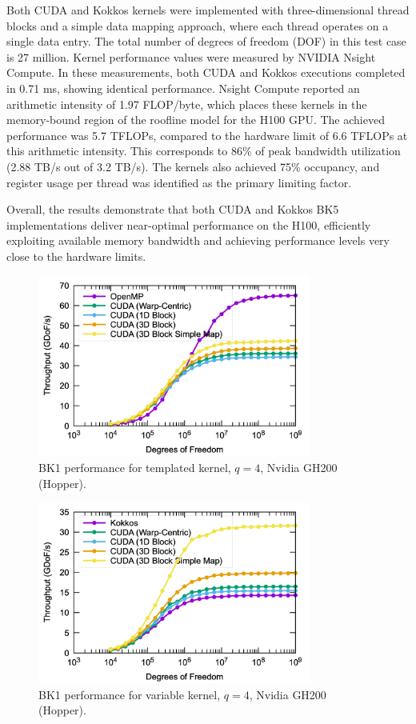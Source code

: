 \documentclass[a4paper,12pt]{article}
\begin{document}
Both CUDA and Kokkos kernels were implemented with three-dimensional thread blocks and a simple data mapping approach, where each thread operates on a single data entry. The total number of degrees of freedom (DOF) in this test case is 27 million. Kernel performance values were measured by NVIDIA Nsight Compute. In these measurements, both CUDA and Kokkos executions completed in 0.71 ms, showing identical performance. Nsight Compute reported an arithmetic intensity of 1.97 FLOP/byte, which places these kernels in the memory-bound region of the roofline model for the H100 GPU. The achieved performance was 5.7 TFLOPs, compared to the hardware limit of 6.6 TFLOPs at this arithmetic intensity. This corresponds to 86\% of peak bandwidth utilization (2.88 TB/s out of 3.2 TB/s). The kernels also achieved 75\% occupancy, and register usage per thread was identified as the primary limiting factor.

Overall, the results demonstrate that both CUDA and Kokkos BK5 implementations deliver near-optimal performance on the H100, efficiently exploiting available memory bandwidth and achieving performance levels very close to the hardware limits.


%
%

\begin{figure}[htbp]
  \centering
  \includegraphics[width=0.8\textwidth]{gh200_templated} %
  \caption{BK1 performance for templated kernel, $q = 4$, Nvidia GH200 (Hopper).}
  \label{fig:gh200_templated}
\end{figure}

\begin{figure}[htbp]
  \centering
  \includegraphics[width=0.8\textwidth]{gh200_variable} %
  \caption{BK1 performance for variable kernel, $q = 4$, Nvidia GH200 (Hopper).}
  \label{fig:gh200_variable}
\end{figure}
\end{document}
